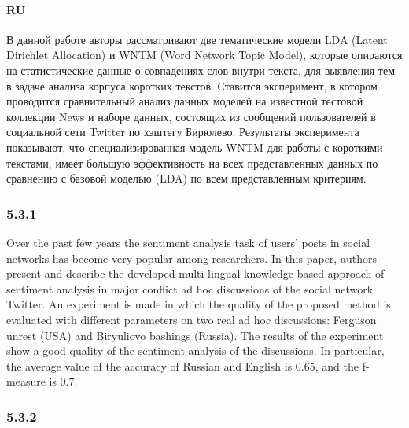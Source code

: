\paragraph{RU} В данной работе авторы рассматривают две тематические модели LDA (Latent Dirichlet Allocation) и WNTM (Word Network Topic Model), которые опираются на статистические данные о совпадениях слов внутри текста, для выявления тем в задаче анализа корпуса коротких текстов. Ставится эксперимент, в котором проводится сравнительный анализ данных моделей на известной тестовой коллекции News и наборе данных, состоящих из сообщений пользователей в социальной сети Twitter по хэштегу Бирюлево. Результаты эксперимента показывают, что специализированная модель WNTM для работы с короткими текстами, имеет большую эффективность на всех представленных данных по сравнению с базовой моделью (LDA) по всем представленным критериям.

\subsubsection{5.3.1}

Over the past few years the sentiment analysis task of users' posts in social networks has become very popular among researchers. In this paper, authors present and describe the developed multi-lingual knowledge-based approach of sentiment analysis in major conflict ad hoc discussions of the social network Twitter. An experiment is made in which the quality of the proposed method is evaluated with different parameters on two real ad hoc discussions: Ferguson unrest (USA) and Biryuliovo bashings (Russia). The results of the experiment show a good quality of the sentiment analysis of the discussions. In particular, the average value of the accuracy of Russian and English is 0.65, and the f-measure is 0.7.

\subsubsection{5.3.2}

